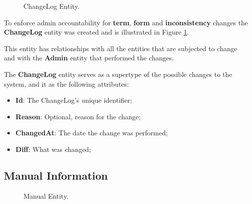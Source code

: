 \begin{figure}[H]
	\begin{center}
	\end{center}
	\caption{ChangeLog Entity.}\label{fig:changelog_entity}
\end{figure}

To enforce admin accountability for \textbf{term}, \textbf{form} and \textbf{inconsistency} changes the \textbf{ChangeLog} entity was created and is illustrated in Figure \ref{fig:changelog_entity}.

This entity has relationships with all the entities that are subjected to change and with the \textbf{Admin} entity that performed the changes.

The \textbf{ChangeLog} entity serves as a supertype of the possible changes to the system, and it as the following attributes:
\begin{itemize}
	\item \textbf{Id}: The ChangeLog's unique identifier;
	\item \textbf{Reason}: Optional, reason for the change;
	\item \textbf{ChangedAt}: The date the change was performed;
	\item \textbf{Diff}: What was changed;
\end{itemize}






\subsection{Manual Information}

\begin{figure}[H]
	\begin{center}
	\end{center}
	\caption{Manual Entity.}\label{fig:manual_entity}
\end{figure}

